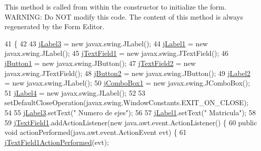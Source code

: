 This method is called from within the constructor to initialize the form. W\+A\+R\+N\+I\+NG\+: Do N\+OT modify this code. The content of this method is always regenerated by the Form Editor. 
\begin{DoxyCode}
41                                   \{
42 
43         \mbox{\hyperlink{classejercicio2_1_1_camion_interfaz_a13844a46462d16486b33610dc0c6bb47}{jLabel3}} = \textcolor{keyword}{new} javax.swing.JLabel();
44         \mbox{\hyperlink{classejercicio2_1_1_camion_interfaz_a490011dc597ba9415392ffbe2ad78bce}{jLabel1}} = \textcolor{keyword}{new} javax.swing.JLabel();
45         \mbox{\hyperlink{classejercicio2_1_1_camion_interfaz_ac094ecbee7fcbad6cf54f57cceb73bdb}{jTextField1}} = \textcolor{keyword}{new} javax.swing.JTextField();
46         \mbox{\hyperlink{classejercicio2_1_1_camion_interfaz_a782e2170ce45db1bd1d32b61d1d7be8c}{jButton1}} = \textcolor{keyword}{new} javax.swing.JButton();
47         \mbox{\hyperlink{classejercicio2_1_1_camion_interfaz_a08c1f3dc1cf2e8d6f09958c97ecdcd6e}{jTextField2}} = \textcolor{keyword}{new} javax.swing.JTextField();
48         \mbox{\hyperlink{classejercicio2_1_1_camion_interfaz_aa5f586a69f5266a210a12f6873d21657}{jButton2}} = \textcolor{keyword}{new} javax.swing.JButton();
49         \mbox{\hyperlink{classejercicio2_1_1_camion_interfaz_a4a0e429b6f6d6aeb7911a2e89cfcf384}{jLabel2}} = \textcolor{keyword}{new} javax.swing.JLabel();
50         \mbox{\hyperlink{classejercicio2_1_1_camion_interfaz_ad99726150fad438267d353b48c6aaf7d}{jComboBox1}} = \textcolor{keyword}{new} javax.swing.JComboBox();
51         \mbox{\hyperlink{classejercicio2_1_1_camion_interfaz_a4a08e18cef32cc5cc683a2d882e3fdcb}{jLabel4}} = \textcolor{keyword}{new} javax.swing.JLabel();
52 
53         setDefaultCloseOperation(javax.swing.WindowConstants.EXIT\_ON\_CLOSE);
54 
55         \mbox{\hyperlink{classejercicio2_1_1_camion_interfaz_a13844a46462d16486b33610dc0c6bb47}{jLabel3}}.setText(\textcolor{stringliteral}{" Numero de ejes"});
56 
57         \mbox{\hyperlink{classejercicio2_1_1_camion_interfaz_a490011dc597ba9415392ffbe2ad78bce}{jLabel1}}.setText(\textcolor{stringliteral}{"      Matricula"});
58 
59         \mbox{\hyperlink{classejercicio2_1_1_camion_interfaz_ac094ecbee7fcbad6cf54f57cceb73bdb}{jTextField1}}.addActionListener(\textcolor{keyword}{new} java.awt.event.ActionListener() \{
60             \textcolor{keyword}{public} \textcolor{keywordtype}{void} actionPerformed(java.awt.event.ActionEvent evt) \{
61                 \mbox{\hyperlink{classejercicio2_1_1_camion_interfaz_ac8b7b51b871c783eda39bb194ae0b72a}{jTextField1ActionPerformed}}(evt);

\end{DoxyCode}
